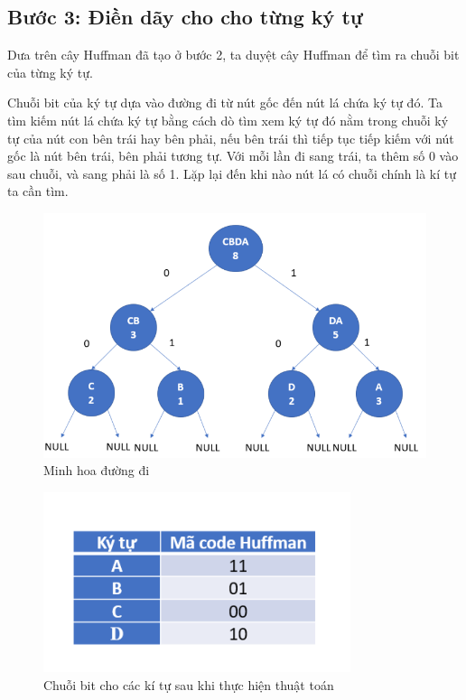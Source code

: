 \documentclass[14pt]{extreport}
\begin{document}
\subsection{Bước 3: Điền dãy cho cho từng ký tự}
Dưa trên cây Huffman đã tạo ở bước 2, ta duyệt cây Huffman để tìm ra chuỗi bit của từng ký tự.

Chuỗi bit của ký tự dựa vào đường đi từ nút gốc đến nút lá chứa ký tự đó. Ta tìm kiếm nút lá chứa ký tự bằng cách dò tìm xem ký tự đó nằm trong chuỗi ký tự của nút con bên trái hay bên phải, nếu bên trái thì tiếp tục tiếp kiếm với nút gốc là nút bên trái, bên phải tương tự. Với mỗi lần đi sang trái, ta thêm số 0 vào sau chuỗi, và sang phải là số 1. Lặp lại đến khi nào nút lá có chuỗi chính là kí tự ta cần tìm. 

\begin{center}
    \begin{figure}[H]
    \begin{center}
     \includegraphics[scale=0.8]{get_code_1.PNG}
    \end{center}
    \caption{Minh hoa đường đi}
    \label{refhinh1}
    \end{figure}
\end{center}

\begin{center}
    \begin{figure}[H]
    \begin{center}
     \includegraphics[scale=1.0]{get_code_2.PNG}
    \end{center}
    \caption{Chuỗi bit cho các kí tự sau khi thực hiện thuật toán}
    \label{refhinh1}
    \end{figure}
\end{center}
\end{document}

